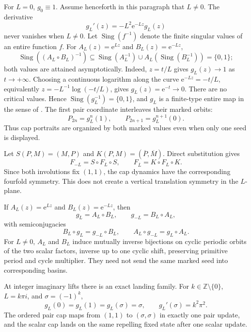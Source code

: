 \documentclass[11pt]{article}
\theoremstyle{definition}
\theoremstyle{remark}
\newcommand{\Z}{\mathbb Z}
\newcommand{\e}{\mathrm e}
\begin{document}
For $L=0$, $g_0\equiv1$.  Assume henceforth in this paragraph that $L\ne0$.  The derivative
\begin{equation}
  g_L'(z)=-L^2\e^{-Lz}g_L(z)
  \label{eq:g-derivative}
\end{equation}
never vanishes when $L\ne0$.  Let $\operatorname{Sing}(f^{-1})$ denote the finite singular values of an entire function $f$.  For $A_L(z)=\e^{Lz}$ and $B_L(z)=\e^{-Lz}$,
\[
  \operatorname{Sing}((A_L\circ B_L)^{-1})
  \subseteq \operatorname{Sing}(A_L^{-1})
  \cup A_L\!\left(\operatorname{Sing}(B_L^{-1})\right)
  =\{0,1\};
\]
both values are attained asymptotically.  Indeed, $z=t/L$ gives $g_L(z)\to1$ as $t\to+\infty$.  Choosing a continuous logarithm along the curve $
\e^{-Lz}=-t/L$, equivalently
$z=-L^{-1}\log(-t/L)$, gives $g_L(z)=\e^{-t}\to0$.  There are no critical values.  Hence $\operatorname{Sing}(g_L^{-1})=\{0,1\}$, and $g_L$ is a finite-type entire map in the sense of \citet{EremenkoLyubich1992}.  The first pair coordinate interleaves their marked orbits:
\begin{equation}
  P_{2n}=g_L^n(1),
  \qquad
  P_{2n+1}=g_L^{n+1}(0).
  \label{eq:marked-interleave}
\end{equation}
Thus cap portraits are organized by both marked values even when only one seed is displayed.

Let $S(P,M)=(M,P)$ and $K(P,M)=(\overline P,\overline M)$.  Direct substitution gives
\begin{equation}
  F_{-L}=S\circ F_L\circ S,
  \qquad
  F_{\overline L}=K\circ F_L\circ K.
  \label{eq:pair-symmetries}
\end{equation}
Since both involutions fix $(1,1)$, the cap dynamics have the corresponding fourfold symmetry.  This does not create a vertical translation symmetry in the $L$-plane.

If $A_L(z)=\e^{Lz}$ and $B_L(z)=\e^{-Lz}$, then
\begin{equation}
  g_L=A_L\circ B_L,
  \qquad g_{-L}=B_L\circ A_L,
\end{equation}
with semiconjugacies
\[
  B_L\circ g_L=g_{-L}\circ B_L,
  \qquad
  A_L\circ g_{-L}=g_L\circ A_L.
\]
For $L\ne0$, $A_L$ and $B_L$ induce mutually inverse bijections on cyclic periodic orbits of the two scalar factors, inverse up to one cyclic shift, preserving primitive period and cycle multiplier.  They need not send the same marked seed into corresponding basins.

At integer imaginary lifts there is an exact landing family.  For $k\in\Z\setminus\{0\}$, $L=k\pi i$, and $\sigma=(-1)^k$,
\begin{equation}
  g_L(0)=g_L(1)=g_L(\sigma)=\sigma,
  \qquad g_L'(\sigma)=k^2\pi^2.
\end{equation}
The ordered pair cap maps from $(1,1)$ to $(\sigma,\sigma)$ in exactly one pair update, and the scalar cap lands on the same repelling fixed state after one scalar update.
\end{document}
